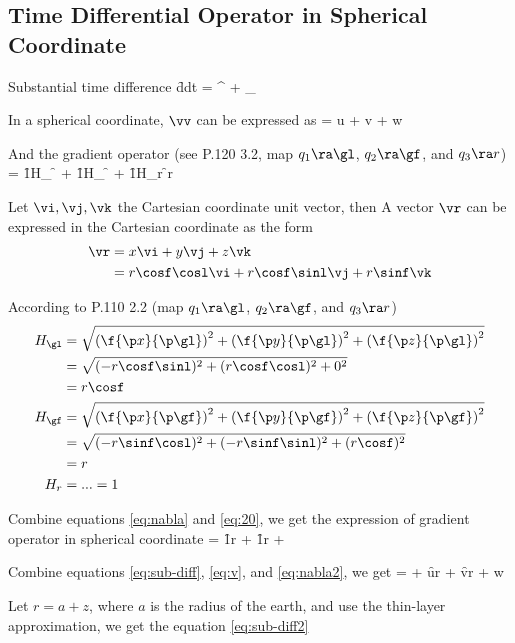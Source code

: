 \subsection{Time Differential Operator in Spherical Coordinate}
\label{der:diff}

Substantial time difference 
\beeq \label{eq:sub-diff}
\f{d}{dt} = ^ + 
_
\eneq

In a spherical coordinate, $\vv$ can be expressed as
\beeq \label{eq:v}
\vv = u \vel + v \vef + w \ver
\eneq

And the gradient operator (see \citet{Xie2012_book}{P.120 3.2}, 
map $q_1\ra \gl$, $q_2\ra \gf$, and $q_3\ra r$)
\beeq \label{eq:nabla}
\gn = \vel \f{1}{H_\gl} \f{\p}{\p \gl} + 
      \vef \f{1}{H_\gf} \f{\p}{\p \gf} + 
      \ver \f{1}{H_r}   \f{\p}{\p r}
\eneq

Let $\vi, \vj, \vk$ the Cartesian coordinate unit
vector, then A vector $\vr$ can be expressed in the Cartesian coordinate
as the form
\begin{align}
\vr &= x \vi + y \vj + z \vk \nonumber \\
    &= r \cosf \cosl \vi + r \cosf \sinl \vj + r \sinf \vk
\end{align}

According to \citet{Xie2012_book}{P.110 2.2} 
(map $q_1\ra \gl$, $q_2\ra \gf$, and $q_3\ra r$)
\bese \label{eq:20}
\begin{align}
  H_\gl &= \sqrt{ 
\left( \f{\p x}{\p \gl} \right)^2 +
\left( \f{\p y}{\p \gl} \right)^2 +
\left( \f{\p z}{\p \gl} \right)^2 } \notag\\
&= \sqrt{ (-r\cosf \sinl)^2 + (r\cosf \cosl)^2 + 0^2 }\notag\\
&= r\cosf \\
  H_\gf &= \sqrt{ 
\left( \f{\p x}{\p \gf} \right)^2 +
\left( \f{\p y}{\p \gf} \right)^2 +
\left( \f{\p z}{\p \gf} \right)^2 }\notag \\
&= \sqrt{ (-r\sinf \cosl)^2 + (-r\sinf \sinl)^2 + (r\cosf)^2 } \notag \\
&= r \\
  H_r &= ... = 1
\end{align}
\ense

Combine equations \ref{eq:nabla} and \ref{eq:20},
we get the expression of gradient operator in spherical coordinate
\beeq \label{eq:nabla2}
\gn = \vel \f{1}{r\cosf} \fp{}{\gl} + \vef\f{1}{r} \fp{}{\gf} + \ver{}
\eneq

Combine equations \ref{eq:sub-diff}, \ref{eq:v}, and \ref{eq:nabla2}, we get
\beeq
{} =  + \f{u}{r\cosf} \fp{}{\gl} + \f{v}{r} \fp{}{\gf} + w
\eneq

Let $r=a+z$, where $a$ is the radius of the earth, and use the thin-layer
approximation, we get the equation \ref{eq:sub-diff2}
